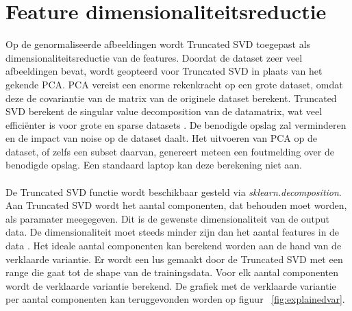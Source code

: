 \section{Feature dimensionaliteitsreductie}\label{sec:poc-featuredim}
Op de genormaliseerde afbeeldingen wordt Truncated SVD toegepast als dimensionaliteitsreductie van de features. Doordat de dataset zeer veel afbeeldingen bevat, wordt geopteerd voor Truncated SVD in plaats van het gekende PCA. PCA vereist een enorme rekenkracht op een grote dataset, omdat deze de covariantie van de matrix van de originele dataset berekent. Truncated SVD berekent de singular value decomposition van de datamatrix, wat veel efficiënter is voor grote en sparse datasets \autocite{Baruah2023}. De benodigde opslag zal verminderen en de impact van noise op de dataset daalt. Het uitvoeren van PCA op de dataset, of zelfs een subset daarvan, genereert meteen een foutmelding over de benodigde opslag. Een standaard laptop kan deze berekening niet aan.\\
\\
De Truncated SVD functie wordt beschikbaar gesteld via \textit{sklearn.decomposition}. Aan Truncated SVD wordt het aantal componenten, dat behouden moet worden, als paramater meegegeven. Dit is de gewenste dimensionaliteit van de output data. De dimensionaliteit moet steeds minder zijn dan het aantal features in de data \autocite{ScikitLearn2024}. Het ideale aantal componenten kan berekend worden aan de hand van de verklaarde variantie. Er wordt een lus gemaakt door de Truncated SVD met een range die gaat tot de shape van de trainingsdata. Voor elk aantal componenten wordt de verklaarde variantie berekend. De grafiek met de verklaarde variantie per aantal componenten kan teruggevonden worden op figuur {~\ref{fig:explainedvar}}. \\
\\ 
